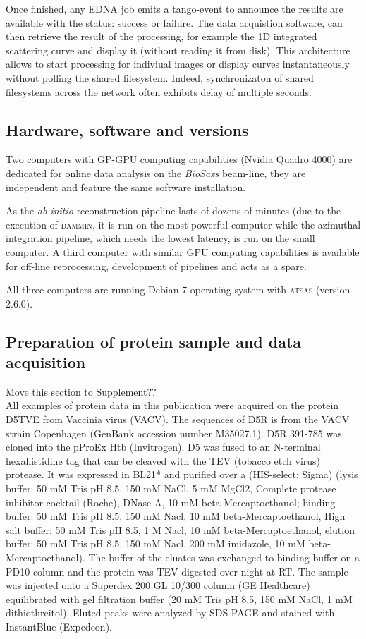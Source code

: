 \documentclass[preprint,pdf]{iucr}              %
\begin{document}
Once finished, any EDNA job emits a tango-event to announce the results are
available with the status: success or failure.
The data acquistion software, can then retrieve the result
of the processing, for example the 1D integrated scattering curve and
display it (without reading it from disk).
This architecture allows to start processing for indiviual images or
display curves instantaneously without polling the shared filesystem.
Indeed, synchronizaton of shared filesystems across the network
often exhibits delay of multiple seconds.

\subsection{Hardware, software and versions}
Two computers with GP-GPU computing capabilities (Nvidia Quadro 4000) are
dedicated for online data analysis on the \textit{BioSaxs} beam-line, they are
independent and feature the same software installation.

As the \textit{ab initio} reconstruction pipeline lasts of dozens of minutes
(due to the execution of \textsc{dammin}, it is run on the most powerful
computer while the azimuthal integration pipeline, which needs the lowest latency, is run on
the small computer.
A third computer with similar GPU computing capabilities is available for
off-line reprocessing, development of pipelines and acts as a spare.

All three computers are running Debian 7 operating system with \textsc{atsas}
(version 2.6.0).


\subsection{Preparation of protein sample and data acquisition}
 Move this section to Supplement??\\
All examples of protein data in this publication were acquired on the protein
D5TVE from Vaccinia virus (VACV).
The sequences of D5R is from the VACV strain Copenhagen (GenBank accession
number M35027.1). D5R 391-785 was cloned into the pProEx Htb (Invitrogen).
D5 was fused to an N-terminal hexahistidine tag that can be cleaved with the TEV
(tobacco etch virus) protease.
It was expressed in BL21* and purified over a (HIS-select; Sigma) (lysis buffer:
50 mM Tris pH 8.5, 150 mM NaCl, 5 mM MgCl2, Complete protease inhibitor cocktail
(Roche), DNase A, 10 mM beta-Mercaptoethanol; binding buffer: 50 mM Tris pH 8.5,
150 mM Nacl, 10 mM beta-Mercaptoethanol, High salt buffer: 50 mM Tris pH 8.5, 1
M Nacl, 10 mM beta-Mercaptoethanol, elution buffer: 50 mM Tris pH 8.5, 150 mM
Nacl,  200 mM imidazole, 10 mM beta-Mercaptoethanol).
The buffer of the eluates was exchanged to binding buffer on a PD10 column and
the protein was TEV-digested over night at RT.
The sample was injected onto a Superdex 200 GL 10/300 column (GE Healthcare)
equilibrated with gel filtration buffer (20 mM Tris pH 8.5, 150 mM NaCl, 1 mM dithiothreitol).
Eluted peaks were analyzed by SDS-PAGE and stained with InstantBlue (Expedeon).
\end{document}

